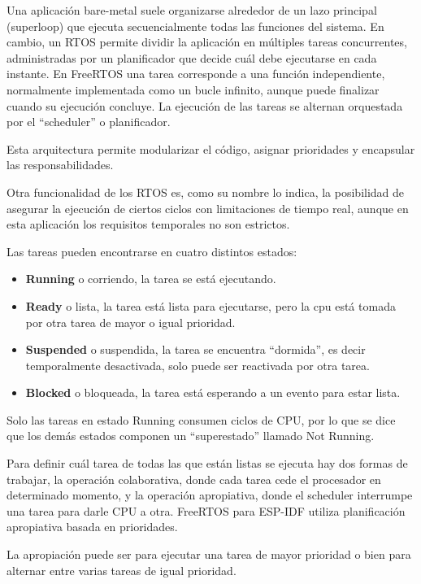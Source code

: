 Una aplicación bare-metal suele organizarse alrededor de un lazo principal (superloop) que ejecuta secuencialmente todas las funciones del sistema. En cambio, un RTOS permite dividir la aplicación en múltiples tareas concurrentes, administradas por un planificador que decide cuál debe ejecutarse en cada instante. En FreeRTOS una tarea corresponde a una función independiente, normalmente implementada como un bucle infinito, aunque puede finalizar cuando su ejecución concluye. La ejecución de las tareas se alternan orquestada por el \enquote{scheduler} o planificador.

Esta arquitectura permite modularizar el código, asignar prioridades y encapsular las responsabilidades.

Otra  funcionalidad de los RTOS es, como su nombre lo indica, la posibilidad de asegurar la ejecución de ciertos ciclos con limitaciones de tiempo real, aunque en esta aplicación los requisitos temporales no son estrictos.


Las tareas pueden encontrarse en cuatro distintos estados:

\begin{itemize}
    \item \textbf{Running} o corriendo, la tarea se está ejecutando.
    \item \textbf{Ready} o lista, la tarea está lista para ejecutarse, pero la cpu está tomada por otra tarea de mayor o igual prioridad.
    \item \textbf{Suspended} o suspendida, la tarea se encuentra \enquote{dormida}, es decir temporalmente desactivada, solo puede ser reactivada por otra tarea.
    \item \textbf{Blocked} o bloqueada, la tarea está esperando a un evento para estar lista.
\end{itemize}
Solo las tareas en estado Running consumen ciclos de CPU, por lo que se dice que los demás estados componen un \enquote{superestado} llamado Not Running.

Para definir cuál tarea de todas las que están listas se ejecuta hay dos formas de trabajar, la operación colaborativa, donde cada tarea cede el procesador en determinado momento, y la operación apropiativa, donde el scheduler interrumpe una tarea para darle CPU a otra. FreeRTOS para ESP-IDF utiliza planificación apropiativa basada en prioridades.

La apropiación puede ser para ejecutar una tarea de mayor prioridad o bien para alternar entre varias tareas de igual prioridad.

